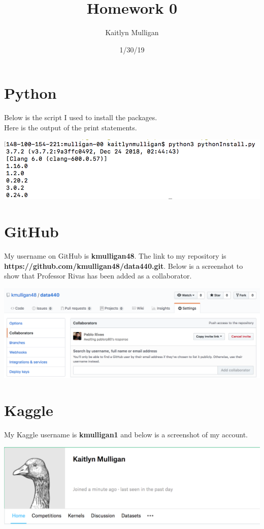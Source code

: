 \documentclass[a4paper]{article}
\title{Homework 0}
\author{Kaitlyn Mulligan}
\date{1/30/19}
\begin{document}
\lstset{language=Python}

\maketitle

\section{Python}
Below is the script I used to install the packages.\\

Here is the output of the print statements.\\
\begin{center}
  \includegraphics[width=1\textwidth]{output.jpg}
\end{center}

\section{GitHub}
My username on GitHub is \textbf{kmulligan48}.  The link to my repository is 
\textbf{https://github.com/kmulligan48/data440.git}.  Below is a screenshot to show that 
Professor Rivas has been added as a collaborator.
\begin{center}
  \includegraphics[width=1\textwidth]{collaborator.jpg}
\end{center}

\section{Kaggle}
My Kaggle username is \textbf{kmulligan1} and below is a screenshot of my account.
\begin{center}
  \includegraphics[width=1\textwidth]{kaggle.jpg}
\end{center}
\end{document}
